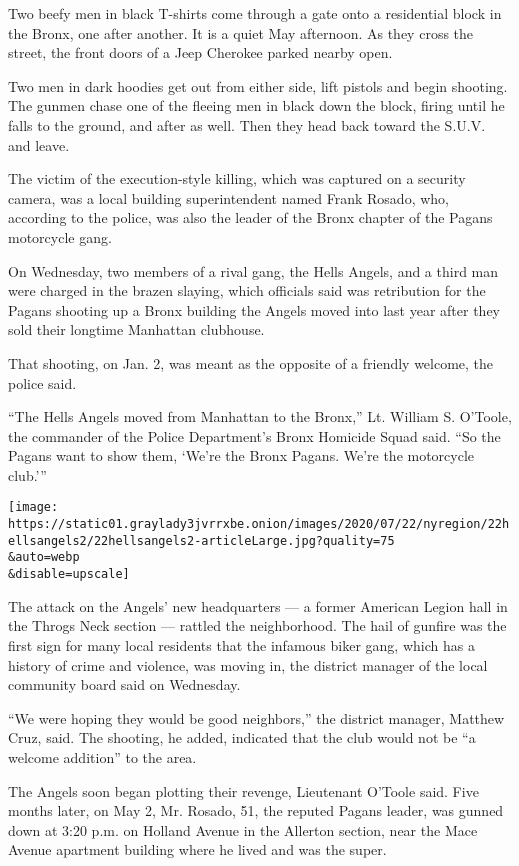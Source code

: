 Two beefy men in black T-shirts come through a gate onto a residential
block in the Bronx, one after another. It is a quiet May afternoon. As
they cross the street, the front doors of a Jeep Cherokee parked nearby
open.

Two men in dark hoodies get out from either side, lift pistols and begin
shooting. The gunmen chase one of the fleeing men in black down the
block, firing until he falls to the ground, and after as well. Then they
head back toward the S.U.V. and leave.

The victim of the execution-style killing, which was captured on a
security camera, was a local building superintendent named Frank Rosado,
who, according to the police, was also the leader of the Bronx chapter
of the Pagans motorcycle gang.

On Wednesday, two members of a rival gang, the Hells Angels, and a third
man were charged in the brazen slaying, which officials said was
retribution for the Pagans shooting up a Bronx building the Angels moved
into last year after they sold their longtime Manhattan clubhouse.

That shooting, on Jan. 2, was meant as the opposite of a friendly
welcome, the police said.

``The Hells Angels moved from Manhattan to the Bronx,'' Lt. William S.
O'Toole, the commander of the Police Department's Bronx Homicide Squad
said. ``So the Pagans want to show them, `We're the Bronx Pagans. We're
the motorcycle club.'''

\texttt{[image: https://static01.graylady3jvrrxbe.onion/images/2020/07/22/nyregion/22hellsangels2/22hellsangels2-articleLarge.jpg?quality=75\\\&auto=webp\\\&disable=upscale]}

The attack on the Angels' new headquarters --- a former American Legion
hall in the Throgs Neck section --- rattled the neighborhood. The hail
of gunfire was the first sign for many local residents that the infamous
biker gang, which has a history of crime and violence, was moving in,
the district manager of the local community board said on Wednesday.

``We were hoping they would be good neighbors,'' the district manager,
Matthew Cruz, said. The shooting, he added, indicated that the club
would not be ``a welcome addition'' to the area.

The Angels soon began plotting their revenge, Lieutenant O'Toole said.
Five months later, on May 2, Mr. Rosado, 51, the reputed Pagans leader,
was gunned down at 3:20 p.m. on Holland Avenue in the Allerton section,
near the Mace Avenue apartment building where he lived and was the
super.

